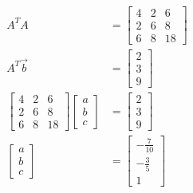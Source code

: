 \documentclass{math}
\begin{document}
\begin{align*}
  A^TA &= \begin{bmatrix}
    4 & 2 & 6 \\
    2 & 6 & 8 \\
    6 & 8 & 18
  \end{bmatrix} \\
  A^T\vec{b} &= \begin{bmatrix}2 \\ 3 \\ 9\end{bmatrix} \\
  \begin{bmatrix}
    4 & 2 & 6 \\
    2 & 6 & 8 \\
    6 & 8 & 18
  \end{bmatrix}\begin{bmatrix}a \\ b \\ c\end{bmatrix} &= \begin{bmatrix}
    2 \\ 3 \\ 9
  \end{bmatrix} \\
  \begin{bmatrix}a \\ b \\ c\end{bmatrix} &= \begin{bmatrix}
    -\frac{7}{10} \\ -\frac{3}{5} \\ 1
  \end{bmatrix}
\end{align*}
\end{document}
